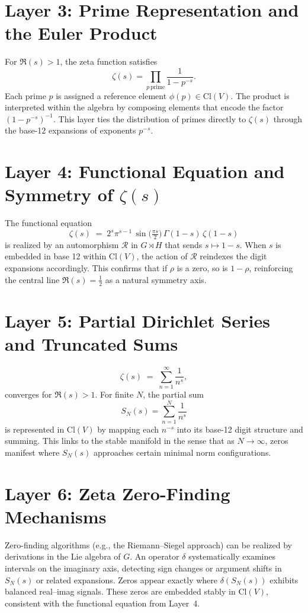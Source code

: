 \documentclass[11pt]{article}
\begin{document}
\section{Layer 3: Prime Representation and the Euler Product}
For \(\Re(s)>1\), the zeta function satisfies
\[
  \zeta(s) = \prod_{p \,\text{prime}} \frac{1}{1-p^{-s}}.
\]
Each prime \(p\) is assigned a reference element \(\phi(p)\in \mathrm{Cl}(V)\). The product is interpreted within the algebra by composing elements that encode the factor \((1-p^{-s})^{-1}\). This layer ties the distribution of primes directly to \(\zeta(s)\) through the base-12 expansions of exponents \(p^{-s}\).

\section{Layer 4: Functional Equation and Symmetry of \(\zeta(s)\)}
\label{sec:functional-equation}
The functional equation
\[
  \zeta(s)\;=\;2^s \pi^{s-1}\,\sin\!\bigl(\tfrac{\pi s}{2}\bigr)\,\Gamma(1-s)\,\zeta(1-s)
\]
is realized by an automorphism \(\mathcal{R}\) in \(G\rtimes H\) that sends \(s \mapsto 1-s\). When $s$ is embedded in base 12 within \(\mathrm{Cl}(V)\), the action of \(\mathcal{R}\) reindexes the digit expansions accordingly. This confirms that if $\rho$ is a zero, so is $1-\rho$, reinforcing the central line $\Re(s)=\tfrac12$ as a natural symmetry axis.

\section{Layer 5: Partial Dirichlet Series and Truncated Sums}
\label{sec:partial-sums}
\[
  \zeta(s) \;=\; \sum_{n=1}^{\infty} \frac{1}{n^s}, 
\]
converges for $\Re(s)>1$. For finite $N$, the partial sum 
\[
  S_N(s) = \sum_{n=1}^{N} \frac{1}{n^s}
\]
is represented in \(\mathrm{Cl}(V)\) by mapping each $n^{-s}$ into its base-12 digit structure and summing. This links to the stable manifold in the sense that as $N\to\infty$, zeros manifest where $S_N(s)$ approaches certain minimal norm configurations.

\section{Layer 6: Zeta Zero-Finding Mechanisms}
\label{sec:zero-finding}
Zero-finding algorithms (e.g., the Riemann--Siegel approach) can be realized by derivations in the Lie algebra of $G$. An operator $\delta$ systematically examines intervals on the imaginary axis, detecting sign changes or argument shifts in $S_N(s)$ or related expansions. Zeros appear exactly where $\delta(S_N(s))$ exhibits balanced real--imag signals. These zeros are embedded stably in \(\mathrm{Cl}(V)\), consistent with the functional equation from Layer~4.
\end{document}
